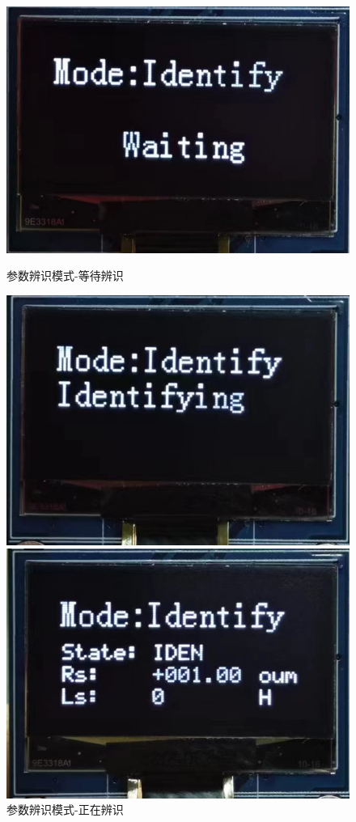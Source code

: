 ﻿\documentclass[12pt,a4paper]{article}
\begin{document}
\begin{figure}[!htbp]
\begin{minipage}{0.29\linewidth}
    \includegraphics[width=\linewidth]{picture/ID1.jpg}
    \caption{参数辨识模式-等待辨识}
  \end{minipage}
  \begin{minipage}{0.29\linewidth}
    \centering
    \includegraphics[width=\linewidth]{picture/ID3.jpg}
    \caption{参数辨识模式-正在辨识}
  \end{minipage}
  \begin{minipage}{0.29\linewidth}
    \centering
    \includegraphics[width=\linewidth]{picture/ID2.jpg}

\end{minipage}
\end{figure}
\end{document}

